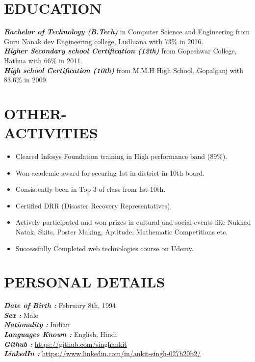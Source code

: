 \documentclass[margin, 10pt]{res} %
\begin{document}
\begin{resume}
\section{EDUCATION} 
{\sl \textbf{Bachelor of Technology (B.Tech)}} in Computer Science and Engineering from Guru Nanak dev Engineering college, Ludhiana with 73\%  in 2016.\\
{\sl \textbf{Higher Secondary school Certification (12th)}} from Gopeshwar College, Hathua with 66\% in 2011.\\
{\sl \textbf{High school Certification (10th)}} from M.M.H High School, Gopalganj with 83.6\% in 2009.
\section{OTHER-\\ ACTIVITIES} 
\begin{itemize}
\item Cleared Infosys Foundation training in High performance band (89\%).
\item Won academic award for securing 1st in district in 10th board. 
\item Consistently been in Top 3 of class from 1st-10th. 
\item Certified DRR (Disaster Recovery Representatives). 
\item Actively participated and won prizes in cultural and social events like Nukkad Natak, Skits, Poster Making, Aptitude, Mathematic Competitions etc.
\item Successfully Completed web technologies course on Udemy. 
\end{itemize}
\section{PERSONAL DETAILS} 
{\sl \textbf{Date of Birth :}} February 8th, 1994 \\
{\sl \textbf{Sex :}} Male \\
{\sl \textbf{Nationality :}} Indian \\
{\sl \textbf{Languages Known :}} English, Hindi \\
{\sl \textbf{Github :}} \url{https://github.com/singhankit} \\
{\sl \textbf{LinkedIn :}} \url{https://www.linkedin.com/in/ankit-singh-027b20b2/}

\end{resume}
\end{document}
